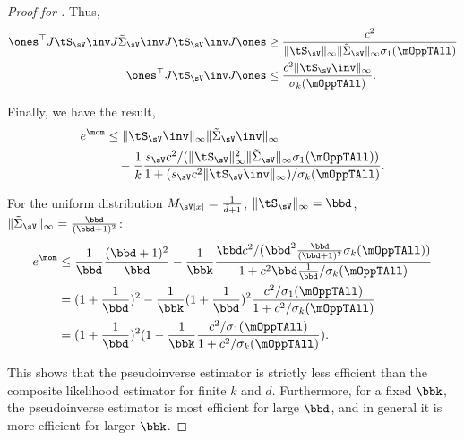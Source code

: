 \begin{proof}[Proof for ]
  Thus,
  \begin{align*}
      \ones^\top J \tS_\sV\inv J \tilde\Sigma_\sV\inv J \tS_\sV\inv J \ones 
      &\ge \frac
          {c^2}
          { \|\tS_\sV\|_{\infty} \|\tilde\Sigma_\sV\|_{\infty}
          \sigma_{1}(\mOppTAll)} \\
      \ones^\top J \tS_\sV\inv J \ones  
      &\le \frac
          {c^2 \|\tS_\sV\inv\|_{\infty}}
          {\sigma_{k}(\mOppTAll)}.
  \end{align*}

  Finally, we have the result,
  \begin{align*}
    e^\mom 
    &\le \|\tS_\sV\inv\|_\infty  \|\tilde\Sigma_\sV\inv\|_\infty \\
    &\quad - 
        \frac{1}{\bar k} 
    \frac{
        s_\sV c^2 /(\|\tS_\sV\|^2_{\infty} \|\tilde\Sigma_\sV\|_{\infty}
            \sigma_{1}(\mOppTAll))
    }
    {1 + (s_\sV c^2 \|\tS_\sV\inv\|_{\infty})/
          \sigma_{k}(\mOppTAll)
    }.
  \end{align*}

  For the uniform distribution $M_\sV[x] = \frac{1}{\bar d + 1}$,
  $\|\tS_\sV\|_\infty = \bbd$, $\|\tilde
  \Sigma_\sV\|_\infty = \frac{\bbd}{(\bbd + 1)^2}$:
  \begin{align*}
    e^\mom 
    &\le \frac{1}{\bbd} \frac{(\bbd + 1)^2}{\bbd} 
    - \frac{1}{\bbk} \frac{
    \bbd c^2/(\bbd^2 \frac{\bbd}{(\bbd +1)^2} \sigma_{k}(\mOppTAll))
    }{
    1 + c^2 \bbd \frac{1}{\bbd} / \sigma_{k}(\mOppTAll)
    } \\
    &= (1 + \frac{1}{\bbd})^2 - \frac{1}{\bbk} (1 + \frac{1}{\bbd})^2 \frac{c^2/\sigma_{1}(\mOppTAll)}
      {1 + c^2 / \sigma_{k}(\mOppTAll)} \\
    &= (1 + \frac{1}{\bbd})^2 (1 - \frac{1}{\bbk} \frac{c^2/\sigma_{1}(\mOppTAll)}{1 + c^2 / \sigma_{k}(\mOppTAll)}).
  \end{align*}

  This shows that the pseudoinverse estimator is strictly less efficient
  than the composite likelihood estimator for finite $k$ and $d$.
  Furthermore, for a fixed $\bbk$, the pseudoinverse estimator is most
  efficient for large $\bbd$, and in general it is more efficient for
  larger $\bbk$.
\end{proof}

